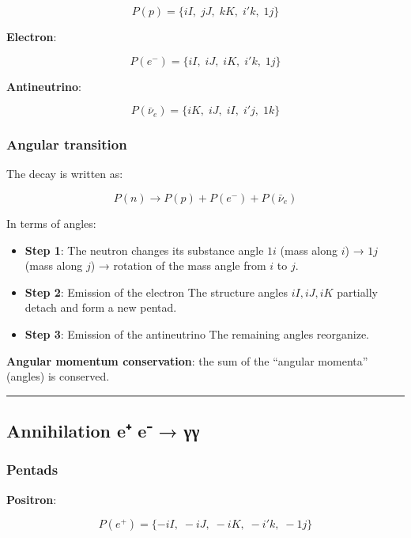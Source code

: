 \documentclass[11pt]{article}
\begin{document}
\[P(p) = \{ iI,\; jJ,\; kK,\; i'k,\; 1j \}\]

\textbf{Electron}:

\[P(e^-) = \{ iI,\; iJ,\; iK,\; i'k,\; 1j \}\]

\textbf{Antineutrino}:

\[P(\bar{\nu}_e) = \{ iK,\; iJ,\; iI,\; i'j,\; 1k \}\]

\hypertarget{angular-transition}{%
\subsubsection{Angular transition}\label{angular-transition}}

The decay is written as:

\[P(n) \to P(p) + P(e^-) + P(\bar{\nu}_e)\]

In terms of angles:

\begin{itemize}
\item
  \textbf{Step 1}: The neutron changes its substance angle \(1i\) (mass
  along \(i\)) → \(1j\) (mass along \(j\)) → rotation of the mass angle
  from \(i\) to \(j\).
\item
  \textbf{Step 2}: Emission of the electron The structure angles
  \(iI, iJ, iK\) partially detach and form a new pentad.
\item
  \textbf{Step 3}: Emission of the antineutrino The remaining angles
  reorganize.
\end{itemize}

\textbf{Angular momentum conservation}: the sum of the ``angular
momenta'' (angles) is conserved.

\begin{center}\rule{0.5\linewidth}{0.5pt}\end{center}

\hypertarget{annihilation-e-e-ux3b3ux3b3}{%
\subsection{Annihilation e⁺ e⁻ → γγ}\label{annihilation-e-e-ux3b3ux3b3}}

\hypertarget{pentads}{%
\subsubsection{Pentads}\label{pentads}}

\textbf{Positron}:

\[P(e^+) = \{ -iI,\; -iJ,\; -iK,\; -i'k,\; -1j \}\]
\end{document}
